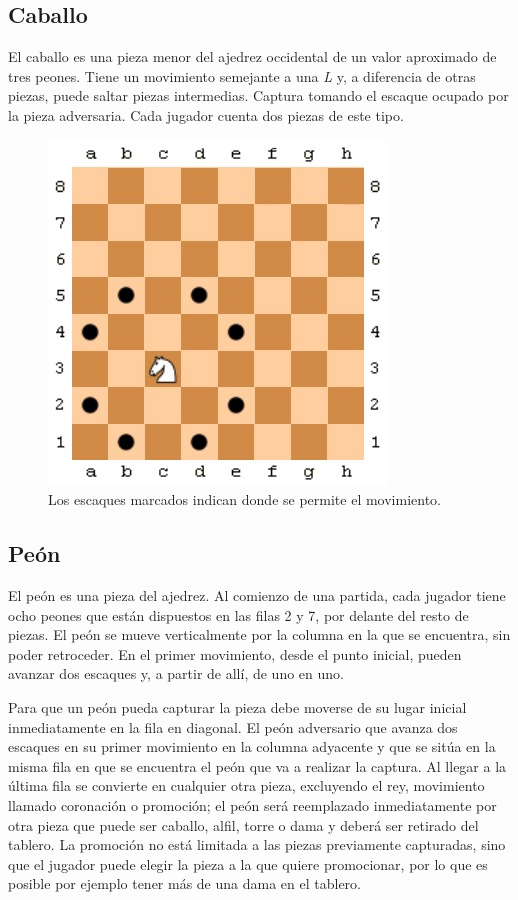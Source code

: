 \subsection{Caballo}

El caballo es una pieza menor del ajedrez occidental de un valor aproximado de tres peones. Tiene un movimiento semejante a una {\em L} y, a diferencia de otras piezas, puede saltar piezas intermedias. Captura tomando el escaque ocupado por la pieza adversaria. Cada jugador cuenta dos piezas de este tipo.

\begin{figure}[!h]
	\centering 
	\includegraphics[scale=0.5]{img/movcaballo}
	\caption{Los escaques marcados indican donde se permite el movimiento.}
	\label{contexto:figura1}
\end{figure}

\subsection{Peón}

El peón es una pieza del ajedrez. Al comienzo de una partida, cada jugador tiene ocho peones que están dispuestos en las filas 2 y 7, por delante del resto de piezas. El peón se mueve verticalmente por la columna en la que se encuentra, sin poder retroceder. En el primer movimiento, desde el punto inicial, pueden avanzar dos escaques y, a partir de allí, de uno en uno. 

Para que un peón pueda capturar la pieza debe moverse de su lugar inicial inmediatamente en la fila en diagonal. El peón adversario que avanza dos escaques en su primer movimiento en la columna adyacente y que se sitúa en la misma fila en que se encuentra el peón que va a realizar la captura. Al llegar a la última fila se convierte en cualquier otra pieza, excluyendo el rey, movimiento llamado coronación o promoción; el peón será reemplazado inmediatamente por otra pieza que puede ser caballo, alfil, torre o dama y deberá ser retirado del tablero. La promoción no está limitada a las piezas previamente capturadas, sino que el jugador puede elegir la pieza a la que quiere promocionar, por lo que es posible por ejemplo tener más de una dama en el tablero.

